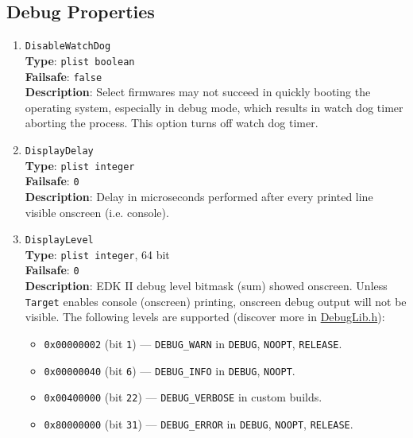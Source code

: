 \documentclass[]{article}
\makeatletter
\providecommand{\tightlist}{%
  \setlength{\itemsep}{0pt}\setlength{\parskip}{0pt}}
\renewcommand{\label}[1]{%
\zref@wrapper@immediate{\oldlabel{#1}}}  %
\makeatother
\begin{document}
\subsection{Debug Properties}\label{miscdebugprops}

\begin{enumerate}

\item
  \texttt{DisableWatchDog}\\
  \textbf{Type}: \texttt{plist\ boolean}\\
  \textbf{Failsafe}: \texttt{false}\\
  \textbf{Description}: Select firmwares may not succeed in quickly booting
  the operating system, especially in debug mode, which results in watch dog
  timer aborting the process. This option turns off watch dog timer.

\item
  \texttt{DisplayDelay}\\
  \textbf{Type}: \texttt{plist\ integer}\\
  \textbf{Failsafe}: \texttt{0}\\
  \textbf{Description}: Delay in microseconds performed after
  every printed line visible onscreen (i.e. console).

\item
  \texttt{DisplayLevel}\\
  \textbf{Type}: \texttt{plist\ integer}, 64 bit\\
  \textbf{Failsafe}: \texttt{0}\\
  \textbf{Description}: EDK II debug level bitmask (sum) showed onscreen.
  Unless \texttt{Target} enables console (onscreen) printing,
  onscreen debug output will not be visible. The following levels
  are supported (discover more in
  \href{https://github.com/tianocore/edk2/blob/UDK2018/MdePkg/Include/Library/DebugLib.h}{DebugLib.h}):

  \begin{itemize}
  \tightlist
    \item \texttt{0x00000002} (bit \texttt{1}) --- \texttt{DEBUG\_WARN} in \texttt{DEBUG},
      \texttt{NOOPT}, \texttt{RELEASE}.
    \item \texttt{0x00000040} (bit \texttt{6}) --- \texttt{DEBUG\_INFO} in \texttt{DEBUG},
      \texttt{NOOPT}.
    \item \texttt{0x00400000} (bit \texttt{22}) --- \texttt{DEBUG\_VERBOSE} in custom builds.
    \item \texttt{0x80000000} (bit \texttt{31}) --- \texttt{DEBUG\_ERROR} in \texttt{DEBUG},
      \texttt{NOOPT}, \texttt{RELEASE}.
  \end{itemize}


\end{enumerate}
\end{document}
